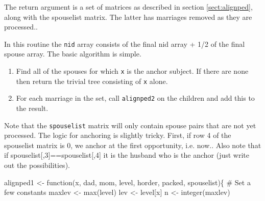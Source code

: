 \documentclass{article}
\begin{document}
The return argument is a set of matrices as described in 
section \ref{sect:alignped}, along with the spouselist matrix.
The latter has marriages removed as they are processed..

In this routine the {\tt{}nid} array consists of the final nid array + 1/2 of the
final spouse array.
The basic algorithm is simple.  
\begin{enumerate}
  \item Find all of the spouses for which {\tt{}x} is the anchor subject.  If
    there are none then return the trivial tree consisting of {\tt{}x} alone.
  \item For each marriage in the set, call {\tt{}alignped2} on the children
    and add this to the result.
\end{enumerate}
Note that the {\tt{}spouselist} matrix will only contain spouse pairs that
are not yet processed.
The logic for anchoring is slightly tricky.  First, if row 4 of
the spouselist matrix is 0, we anchor at the first opportunity, i.e. now..
Also note that if spouselist[,3]==spouselist[,4] it is
the husband who is the anchor (just write out the possibilities).

\nwenddocs{}\endmoddef
alignped1 <- function(x, dad, mom, level, horder, packed, spouselist)\{
    # Set a few constants
    maxlev <- max(level)
    lev <- level[x]
    n <- integer(maxlev)
\end{document}
